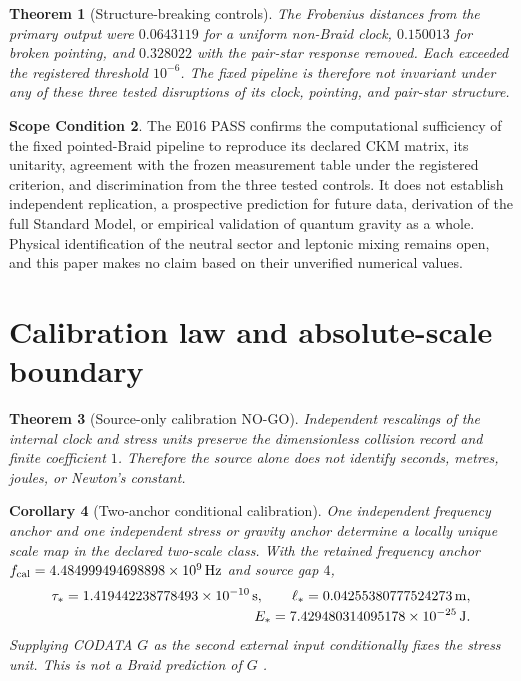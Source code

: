 \documentclass[11pt]{article}
\newtheorem{theorem}{Theorem}[section]
\newtheorem{corollary}[theorem]{Corollary}
\theoremstyle{definition}
\newtheorem{scope}[theorem]{Scope Condition}
\theoremstyle{remark}
\begin{document}
\begin{theorem}[Structure-breaking controls]
The Frobenius distances from the primary output were $0.0643119$ for a uniform non-Braid clock, $0.150013$ for broken pointing, and $0.328022$ with the pair-star response removed. Each exceeded the registered threshold $10^{-6}$. The fixed pipeline is therefore not invariant under any of these three tested disruptions of its clock, pointing, and pair-star structure.
\end{theorem}

\begin{scope}
The E016 PASS confirms the computational sufficiency of the fixed pointed-Braid pipeline to reproduce its declared CKM matrix, its unitarity, agreement with the frozen measurement table under the registered criterion, and discrimination from the three tested controls. It does not establish independent replication, a prospective prediction for future data, derivation of the full Standard Model, or empirical validation of quantum gravity as a whole. Physical identification of the neutral sector and leptonic mixing remains open, and this paper makes no claim based on their unverified numerical values.
\end{scope}

\section{Calibration law and absolute-scale boundary}

\begin{theorem}[Source-only calibration NO-GO]
Independent rescalings of the internal clock and stress units preserve the dimensionless collision record and finite coefficient $1$. Therefore the source alone does not identify seconds, metres, joules, or Newton's constant.
\end{theorem}

\begin{corollary}[Two-anchor conditional calibration]
One independent frequency anchor and one independent stress or gravity anchor determine a locally unique scale map in the declared two-scale class. With the retained frequency anchor $f_{\rm cal}=4.484999494698898\times10^9\,\mathrm{Hz}$ and source gap $4$,
\begin{align}
\tau_*=1.419442238778493\times10^{-10}\,\mathrm{s},
\qquad
\ell_*=0.04255380777524273\,\mathrm{m},
\notag\\[-0.15em]
E_*=7.429480314095178\times10^{-25}\,\mathrm{J}.
\end{align}
Supplying CODATA $G$ as the second external input conditionally fixes the stress unit. This is not a Braid prediction of $G$ \cite{codata2022,bipmSI}.
\end{corollary}
\end{document}

